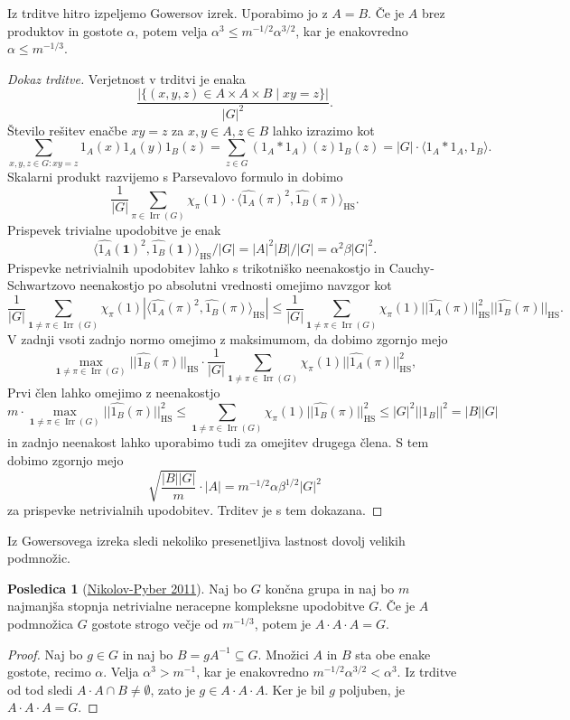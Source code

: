 \documentclass[11pt]{book}
\def\11{\mathbf{1}}
\DeclareMathOperator\Irr{Irr}
\DeclareMathOperator\HS{HS}
\theoremstyle{definition}
\theoremstyle{zgled}
\theoremstyle{odprtproblem}
\theoremstyle{domacanaloga}
\newenvironment{dokaz}
    {\color{siva}\begin{proof}}
    {\end{proof}}
\theoremstyle{izrek}
\newtheorem*{posledica}{Posledica}
\begin{document}
Iz trditve hitro izpeljemo Gowersov izrek. Uporabimo jo z $A=B$. Če je $A$ brez produktov in gostote $\alpha$, potem velja $\alpha^3 \leq m^{-1/2} \alpha^{3/2}$, kar je enakovredno $\alpha \leq m^{-1/3}$.


\begin{dokaz}[Dokaz trditve]
Verjetnost v trditvi je enaka 
\[
    \frac{|\{ (x,y,z) \in A \times A \times B \mid xy = z \}|}{|G|^2}.
\]
Število rešitev enačbe $xy = z$ za $x,y \in A, z \in B$ lahko izrazimo kot
\[
    \sum_{x,y,z \in G \colon xy = z} 1_A(x) 1_A(y) 1_B(z)
    = \sum_{z \in G} (1_A * 1_A)(z) 1_B(z)
    = |G| \cdot \langle 1_A * 1_A, 1_B \rangle.
\]
Skalarni produkt razvijemo s Parsevalovo formulo in dobimo
\[
    \frac{1}{|G|} \sum_{\pi \in \Irr(G)} \chi_{\pi}(1) \cdot \langle \widehat{1_A}(\pi)^2, \widehat{1_B}(\pi) \rangle_{\HS}.
\]
Prispevek trivialne upodobitve je enak
\[
    \langle \widehat{1_A}(\11)^2, \widehat{1_B}(\11) \rangle_{\HS}/|G| = |A|^2 |B| / |G| = \alpha^2 \beta |G|^2. 
\]
Prispevke netrivialnih upodobitev lahko s trikotniško neenakostjo in Cauchy-Schwartzovo neenakostjo po absolutni vrednosti omejimo navzgor kot
\[
    \frac{1}{|G|} \sum_{\11 \neq \pi \in \Irr(G)} \chi_{\pi}(1) \left| \langle \widehat{1_A}(\pi)^2, \widehat{1_B}(\pi) \rangle_{\HS} \right|
    \leq 
    \frac{1}{|G|} \sum_{\11 \neq \pi \in \Irr(G)} \chi_{\pi}(1) || \widehat{1_A}(\pi) ||_{\HS}^2 || \widehat{1_B}(\pi) ||_{\HS}.
\]
V zadnji vsoti zadnjo normo omejimo z maksimumom, da dobimo zgornjo mejo
\[
    \max_{\11 \neq \pi \in \Irr(G)} || \widehat{1_B}(\pi) ||_{\HS} \cdot 
    \frac{1}{|G|} \sum_{\11 \neq \pi \in \Irr(G)} \chi_{\pi}(1) || \widehat{1_A}(\pi) ||_{\HS}^2,
\]
Prvi člen lahko omejimo z neenakostjo
\[
    m \cdot \max_{\11 \neq \pi \in \Irr(G)} || \widehat{1_B}(\pi) ||^2_{\HS}
    \leq \sum_{\11 \neq \pi \in \Irr(G)} \chi_{\pi}(1) ||\widehat{1_B}(\pi)||_{\HS}^2 
    \leq |G|^2 ||1_B||^2 = |B||G|
\]
in zadnjo neenakost lahko uporabimo tudi za omejitev drugega člena. S tem dobimo zgornjo mejo
\[
  \sqrt{\frac{|B||G|}{m}} \cdot |A| = m^{-1/2} \alpha \beta^{1/2} |G|^2
\]
za prispevke netrivialnih upodobitev. Trditev je s tem dokazana.
\end{dokaz}

Iz Gowersovega izreka sledi nekoliko presenetljiva lastnost dovolj velikih podmnožic.

\begin{posledica}[\href{https://eudml.org/doc/277468}{Nikolov-Pyber 2011}]
Naj bo $G$ končna grupa in naj bo $m$ najmanjša stopnja netrivialne neracepne kompleksne upodobitve $G$. Če je $A$ podmnožica $G$ gostote strogo večje od $m^{-1/3}$, potem je $A \cdot A \cdot A = G$.
\end{posledica}
\begin{dokaz}
Naj bo $g \in G$ in naj bo $B = g A^{-1} \subseteq G$. Množici $A$ in $B$ sta obe enake gostote, recimo $\alpha$. Velja $\alpha^3 > m^{-1}$, kar je enakovredno $m^{-1/2} \alpha^{3/2} < \alpha^3$. Iz trditve od tod sledi $A \cdot A \cap B \neq \emptyset$, zato je $g \in A \cdot A \cdot A$. Ker je bil $g$ poljuben, je $A \cdot A \cdot A = G$.
\end{dokaz}
\end{document}
